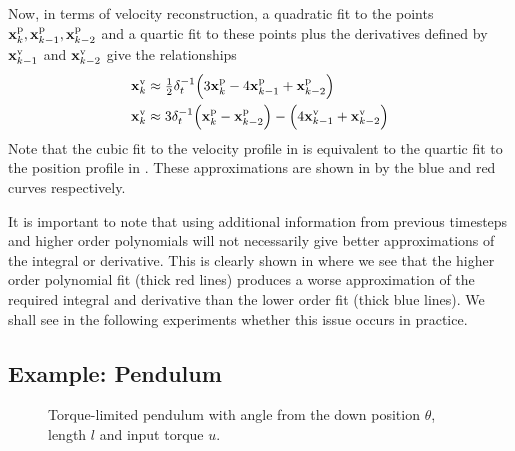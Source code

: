 Now, in terms of velocity reconstruction, a quadratic fit to the points $\mathbf{x}^{\text{p}}_k, \mathbf{x}^{\text{p}}_{k-1}, \mathbf{x}^{\text{p}}_{k-2}$ and a quartic fit to these points plus the derivatives defined by $\mathbf{x}^{\text{v}}_{k-1}$ and $\mathbf{x}^{\text{v}}_{k-2}$ give the relationships
\begin{align}
\mathbf{x}^{\text{v}}_{k} &\approx \tfrac{1}{2} \delta_t^{-1} \Big( 3\mathbf{x}^{\text{p}}_{k} - 4\mathbf{x}^{\text{p}}_{k-1} + \mathbf{x}^{\text{p}}_{k-2} \Big) \label{eqn:dada2} \\
\mathbf{x}^{\text{v}}_{k} &\approx 3\delta_t^{-1} \Big( \mathbf{x}^{\text{p}}_k - \mathbf{x}^{\text{p}}_{k-2} \Big) - \Big( 4\mathbf{x}^{\text{v}}_{k-1} + \mathbf{x}^{\text{v}}_{k-2} \Big) \label{eqn:mama2}
\end{align}
Note that the cubic fit to the velocity profile in  is equivalent to the quartic fit to the position profile in . These approximations are shown in  by the blue and red curves respectively.

It is important to note that using additional information from previous timesteps and higher order polynomials will not necessarily give better approximations of the integral or derivative. This is clearly shown in  where we see that the higher order polynomial fit (thick red lines) produces a worse approximation of the required integral and derivative than the lower order fit (thick blue lines). We shall see in the following experiments whether this issue occurs in practice.


\subsection{Example: Pendulum} \label{sec:pendulum}

\begin{figure}
\centering
\small
{}
\caption{Torque-limited pendulum with angle from the down position $\theta$, length $l$ and input torque $u$.}
\label{fig:pendulum}
\end{figure}



